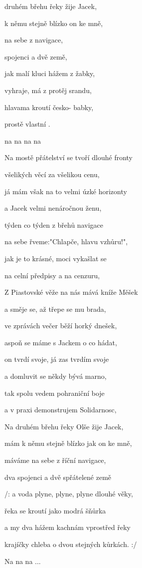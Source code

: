 
\zs
{} druhém břehu řeky  žije Jacek, 

 k němu stejně blízko  on ke mně, 

 na sebe z  navigace, 

 spojenci a dvě  země, 

jak malí kluci hážem z  žabky, 

 vyhraje, má z protěj srandu, 

hlavama kroutí česko- babky, 

 prostě vlastní . 

 na  na  na  na  
\ks

\zs
Na mostě přátelství se tvoří dlouhé fronty 

všelikých věcí za všelikou cenu, 

já mám však na to velmi úzké horizonty 

a Jacek velmi nenáročnou ženu, 

týden co týden z břehů navigace 

na sebe řveme:"Chlapče, hlavu vzhůru!", 

jak je to krásné, moci vykašlat se 

na celní předpisy a na cenzuru, 
\ks

\zs
Z Piastovské věže na nás mává kníže Měšek 

a směje se, až třepe se mu brada, 

ve zprávách večer běží horký dnešek, 

aspoň se máme s Jackem o co hádat, 

on tvrdí svoje, já zas tvrdím svoje 

a domluvit se někdy bývá marno, 

tak spolu vedem pohraniční boje 

a v praxi demonstrujem Solidarnosc, 
\ks

\zs
Na druhém břehu řeky Olše žije Jacek, 

mám k němu stejně blízko jak on ke mně, 

máváme na sebe z říční navigace, 

dva spojenci a dvě spřátelené země 

/: a voda plyne, plyne, plyne dlouhé věky, 

řeka se kroutí jako modrá šňůrka 

a my dva hážem kachnám vprostřed řeky 

krajíčky chleba o dvou stejných kůrkách. :/ 

Na na na ...
\ks
\kp





